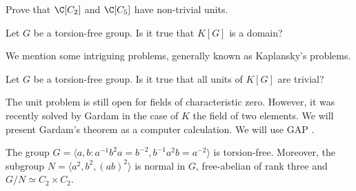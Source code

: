 \begin{exercise}
\label{xca:non_trivial:C2andC5}
	Prove that $\C[C_2]$ and $\C[C_5]$ have non-trivial units.
\end{exercise}


\begin{problem}
	\label{prob:dominio}
	Let $G$ be a torsion-free group. Is it true that 
	$K[G]$ is a domain?
\end{problem}



We mention some intriguing problems, generally known as Kaplansky's problems. 

\begin{problem}[Units]
	\label{prob:units}
	Let $G$ be a torsion-free group. Is it true that all units of $K[G]$ are
	trivial?
\end{problem}

The unit problem is still open for fields of characteristic zero. 
However, it was recently solved by Gardam \cite{MR4334981} 
in the case of 
$K$ the field of two elements. We will present Gardam's theorem 
as a computer calculation. We will use \textsf{GAP} \cite{GAP4}.  

\begin{lemma}
    The group $G=\langle a,b:a^{-1}b^2a=b^{-2},b^{-1}a^2b=a^{-2}\rangle$
    is torsion-free. Moreover, the subgroup $N=\langle a^2,b^2,(ab)^2\rangle$ is normal in $G$, 
    free-abelian of rank three and $G/N\simeq C_2\times C_2$.
\end{lemma}

